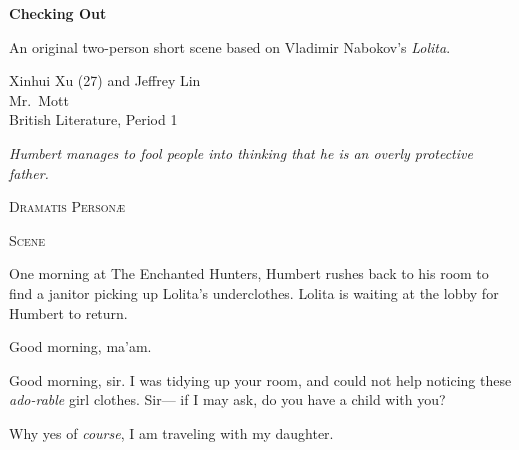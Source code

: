 \documentclass[letterpaper,12pt]{article}
\begin{document}
\begin{titlepage}
  \vspace*{\fill}
  {\Huge \textbf{{Checking Out}}}

  \vspace{1em}
  An original two-person short scene based on Vladimir Nabokov's \textit{Lolita}.

  \vspace{2em}

  Xinhui Xu (27) and Jeffrey Lin \\
  Mr.\ Mott \\
  British Literature, Period 1

  \vspace{3em}

  \vspace*{\fill}
\end{titlepage}

\begin{center}
  \textit{Humbert manages to fool people into thinking that he is an overly protective father.}
\end{center}


\begin{dramatis}
  \begin{center}
    \LARGE{\textsc{Dramatis Person\ae}}
  \end{center}

\end{dramatis}

\begin{center}
  \LARGE{\textsc{Scene}}
\end{center}

\begin{dida}
  One morning at The Enchanted Hunters, Humbert rushes back to his room to find a janitor picking up Lolita's underclothes. Lolita is waiting at the lobby for Humbert to return.
\end{dida}

\hum%
Good morning, ma'am.

\custodian%
Good morning, sir. I was tidying up your room, and could not help noticing these \textit{ado-rable} girl clothes. Sir--- if I may ask, do you have a child with you?

\hum%
Why yes of \textit{course}, I am traveling with my daughter.
\end{document}
